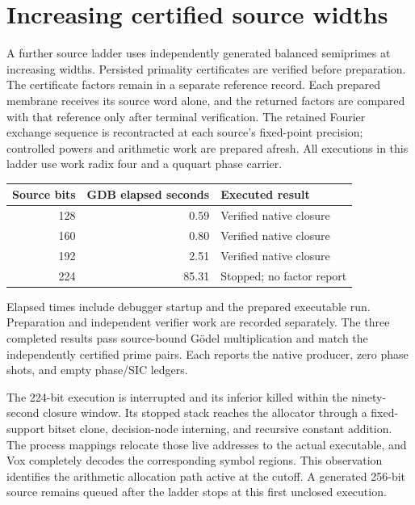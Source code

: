 \section*{Increasing certified source widths}

A further source ladder uses independently generated balanced semiprimes at increasing widths. Persisted primality certificates are verified before preparation. The certificate factors remain in a separate reference record. Each prepared membrane receives its source word alone, and the returned factors are compared with that reference only after terminal verification. The retained Fourier exchange sequence is recontracted at each source's fixed-point precision; controlled powers and arithmetic work are prepared afresh. All executions in this ladder use work radix four and a ququart phase carrier.

\begin{center}
\begin{tabular}{@{}rrl@{}}
\toprule
Source bits & GDB elapsed seconds & Executed result\\
\midrule
128 & 0.59 & Verified native closure\\
160 & 0.80 & Verified native closure\\
192 & 2.51 & Verified native closure\\
224 & 85.31 & Stopped; no factor report\\
\bottomrule
\end{tabular}
\end{center}

Elapsed times include debugger startup and the prepared executable run. Preparation and independent verifier work are recorded separately. The three completed results pass source-bound G\"odel multiplication and match the independently certified prime pairs. Each reports the native producer, zero phase shots, and empty phase/SIC ledgers.

The 224-bit execution is interrupted and its inferior killed within the ninety-second closure window. Its stopped stack reaches the allocator through a fixed-support bitset clone, decision-node interning, and recursive constant addition. The process mappings relocate those live addresses to the actual executable, and Vox completely decodes the corresponding symbol regions. This observation identifies the arithmetic allocation path active at the cutoff. A generated 256-bit source remains queued after the ladder stops at this first unclosed execution.
